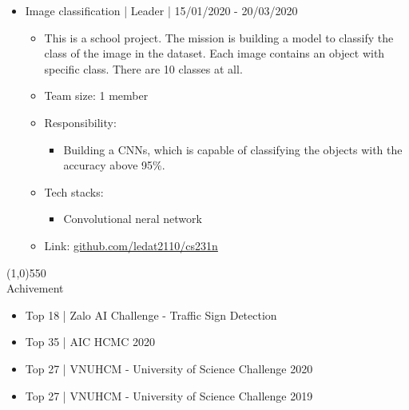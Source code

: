 \documentclass[a4paper, 12pt]{article}
\begin{document}
\begin{itemize}
    \item Image classification | Leader | 15/01/2020 - 20/03/2020
      \begin{itemize}
        \item This is a school project. The mission is building a model to classify the class of the image in the dataset. Each image contains an object with specific class. There are 10 classes at all.
        \item Team size: 1 member
        \item Responsibility:
          \begin{itemize}
              \item Building a CNNs, which is capable of classifying the objects with the accuracy above 95\%.
          \end{itemize}
        \item Tech stacks:
          \begin{itemize}
              \item Convolutional neral network
          \end{itemize}
        \item Link: \url{github.com/ledat2110/cs231n}
      \end{itemize}

      
\end{itemize}

\line(1,0){550}\\
\vspace{5mm}
{\huge Achivement}
\begin{itemize}
    \item Top 18 | Zalo AI Challenge - Traffic Sign Detection
    \item Top 35 | AIC HCMC 2020
    \item Top 27 | VNUHCM - University of Science Challenge 2020
    \item Top 27 | VNUHCM - University of Science Challenge 2019
\end{itemize}
\end{document}
